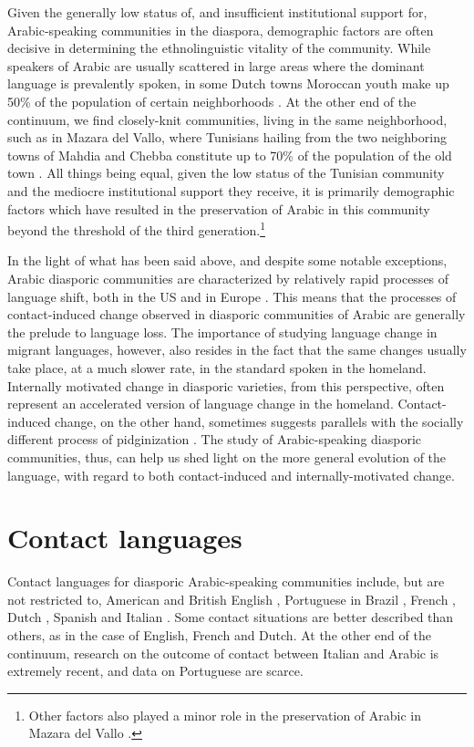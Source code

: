 \documentclass[output=paper]{langsci/langscibook}
\begin{document}
Given the generally low status of, and insufficient institutional support for, Arabic-speaking communities in the diaspora, demographic factors are often decisive in determining the ethnolinguistic vitality of the community. While speakers of Arabic are usually scattered in large areas where the dominant language is prevalently spoken, in some Dutch towns Moroccan youth make up 50\% of the population of certain neighborhoods \citep[50]{Boumans2004}. At the other end of the continuum, we find closely-knit communities, living in the same neighborhood, such as in Mazara del Vallo, where Tunisians hailing from the two neighboring towns of Mahdia and Chebba constitute up to 70\% of the population of the old town \citep[27]{Danna2017book}. All things being equal, given the low status of the Tunisian community and the mediocre institutional support they receive, it is primarily demographic factors which have resulted in the preservation of Arabic in this community beyond the threshold of the third generation.\footnote{Other factors also played a minor role in the preservation of Arabic in Mazara del Vallo \citep[80--81]{Danna2017book}.}

In the light of what has been said above, and despite some notable exceptions, Arabic diasporic communities are characterized by relatively rapid processes of language shift, both in the US \citep[29]{Daher1992} and in Europe \citep[282]{BoumansdeRuiter2002}. This means that the processes of contact-induced change observed in diasporic communities of Arabic are generally the prelude to language loss. The importance of studying language change in migrant languages, however, also resides in the fact that the same changes usually take place, at a much slower rate, in the standard spoken in the homeland. Internally motivated change in diasporic varieties, from this perspective, often represent an accelerated version of language change in the homeland. Contact-induced change, on the other hand, sometimes suggests parallels with the socially different process of pidginization \citep[194--195]{GonzoSaltarelli1983}. The study of Arabic-speaking diasporic communities, thus, can help us shed light on the more general evolution of the language, with regard to both contact-induced and internally-motivated change.

\section{Contact languages}

Contact languages for diasporic Arabic-speaking communities include, but are not restricted to, American \citep{Rouchdy_arabic_1992} and British English \citep{AbuHaidar2012}, Portuguese in Brazil \citep[292]{Versteegh2014book}, French  \citep{BoumansCaubet2000}, Dutch \citep{Boumans2000,Boumans2004,Boumans2007,BoumansCaubet2000,BoumansdeRuiter2002}, Spanish \citep{Vicente2005,Vicente2007} and Italian \citep{Danna2017book,Danna2018Chebba}. Some contact situations are better described than others, as in the case of English, French and Dutch. At the other end of the continuum, research on the outcome of contact between Italian and Arabic is extremely recent, and data on Portuguese are scarce.
\end{document}
